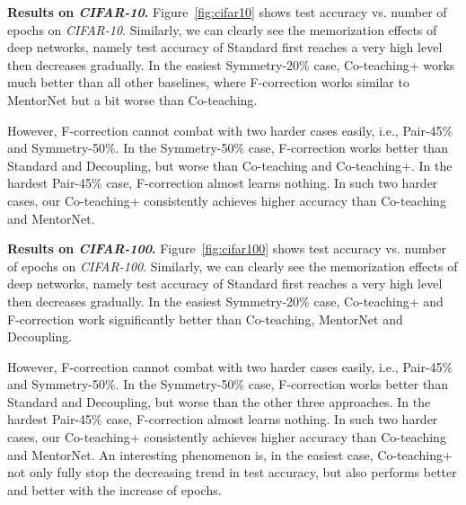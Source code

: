 \documentclass{article}
\begin{document}
\textbf{Results on \textit{CIFAR-10}.}
Figure~\ref{fig:cifar10} shows
test accuracy vs. number of epochs on \mbox{\textit{CIFAR-10}}. Similarly, we can clearly see the memorization effects of deep networks, namely test accuracy of Standard first reaches a very high level then decreases gradually. In the easiest Symmetry-20\% case, Co-teaching+ works much better than all other baselines, where F-correction works similar to MentorNet but a bit worse than Co-teaching.

However, F-correction cannot combat with two harder cases easily, i.e., Pair-45\% and Symmetry-50\%. In the Symmetry-50\% case, F-correction works better than Standard and Decoupling, but worse than Co-teaching and Co-teaching+. In the hardest Pair-45\% case, F-correction almost learns nothing. In such two harder cases, our Co-teaching+ consistently achieves higher accuracy than Co-teaching and MentorNet.



\begin{figure*}[ht]
\centering{}
\caption{Test accuracy vs. number of epochs on \textit{CIFAR-10} dataset.
    }
\label{fig:cifar10}
\end{figure*}

\textbf{Results on \textit{CIFAR-100}.}
Figure~\ref{fig:cifar100} shows test accuracy vs. number of epochs on \mbox{\textit{CIFAR-100}}. Similarly, we can clearly see the memorization effects of deep networks, namely test accuracy of Standard first reaches a very high level then decreases gradually. In the easiest Symmetry-20\% case, Co-teaching+ and F-correction work significantly better than Co-teaching, MentorNet and Decoupling.

However, F-correction cannot combat with two harder cases easily, i.e., Pair-45\% and Symmetry-50\%. In the Symmetry-50\% case, F-correction works better than Standard and Decoupling, but worse than the other three approaches. In the hardest Pair-45\% case, F-correction almost learns nothing. In such two harder cases, our Co-teaching+ consistently achieves higher accuracy than Co-teaching and MentorNet. An interesting phenomenon is, in the easiest case, Co-teaching+ not only fully stop the decreasing trend in test accuracy, but also performs better and better with the increase of epochs.
\end{document}
